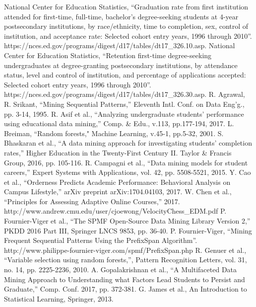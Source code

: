 \documentclass[conference]{IEEEtran}
\begin{document}
\begin{thebibliography}{00}
 National Center for Education Statistics, ``Graduation rate from first institution attended for first-time, full-time, bachelor's degree-seeking students at 4-year postsecondary institutions, by race/ethnicity, time to completion, sex, control of institution, and acceptance rate: Selected cohort entry years, 1996 through 2010''. https://nces.ed.gov/programs/digest/d17/tables/dt17\_326.10.asp.  
 National Center for Education Statistics, ``Retention first-time degree-seeking undergraduates at degree-granting postsecondary institutions, by attendance status, level and control of institution, and percentage of applications accepted: Selected cohort entry years, 1996 through 2010''. https://nces.ed.gov/programs/digest/d17/tables/dt17\_326.30.asp.
 R. Agrawal, R. Srikant, ``Mining Sequential Patterns,'' Eleventh Intl. Conf. on Data Eng'g., pp. 3-14, 1995.
 R. Asif et al., ``Analyzing undergraduate students' performance using educational data mining,'' Comp. \& Edu., v.113, pp.177-194, 2017. 
 L. Breiman, ``Random forests," Machine Learning, v.45-1, pp.5-32, 2001.  
 S. Bhaskaran et al., ``A data mining approach for investigating students' completion rates,'' Higher Education in the Twenty-First Century II. Taylor \& Francis Group, 2016, pp. 105-116.
 R. Campagni et al., ``Data mining models for student careers,'' Expert Systems with Applications, vol. 42, pp. 5508-5521, 2015.
 Y. Cao et al., ``Orderness Predicts Academic Performance: Behavioral Analysis on Campus Lifestyle,'' arXiv preprint arXiv:1704.04103, 2017.
 W. Chen et al., ``Principles for Assessing Adaptive Online Courses,'' 2017. http://www.andrew.cmu.edu/user/cjoewong/VelocityChess\_EDM.pdf  
 P. Fournier-Viger et al., ``The SPMF Open-Source Data Mining Library Version 2,'' PKDD 2016 Part III, Springer LNCS 9853, pp. 36-40.
 P. Fournier-Viger, ``Mining Frequent Sequential Patterns Using the PrefixSpan Algorithm''. http://www.philippe-fournier-viger.com/spmf/PrefixSpan.php
 R. Genuer et al., ``Variable selection using random forests,'', Pattern Recognition Letters, vol. 31, no. 14, pp. 2225-2236, 2010.
 A. Gopalakrishnan et al., ``A Multifaceted Data Mining Approach to Understanding what Factors Lead Students to Persist and Graduate,'' Comp. Conf. 2017, pp. 372-381.
 G. James et al.,  An Introduction to Statistical Learning, Springer, 2013.

\end{thebibliography}
\end{document}

